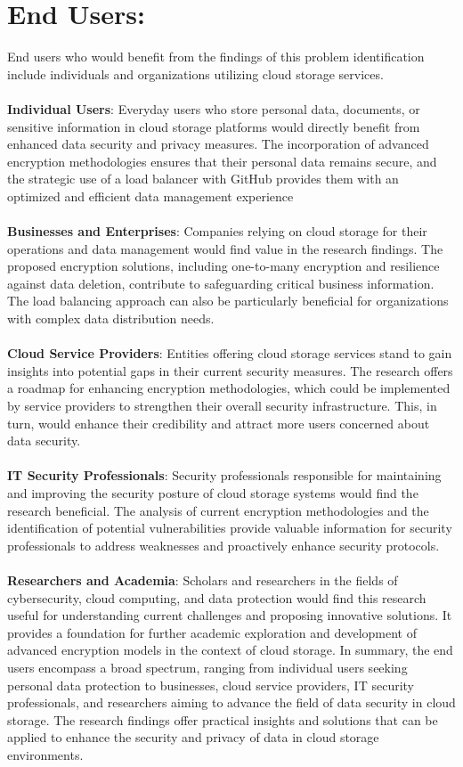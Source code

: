\section {End Users:} End users who would benefit from the findings of this problem identification include individuals
and organizations utilizing cloud storage services.\\
\\
\textbf{Individual Users}: Everyday users who store personal data, documents, or sensitive information in
cloud storage platforms would directly benefit from enhanced data security and privacy measures.
The incorporation of advanced encryption methodologies ensures that their personal data remains
secure, and the strategic use of a load balancer with GitHub provides them with an optimized and
efficient data management experience
\\
\\
\textbf{Businesses and Enterprises}: Companies relying on cloud storage for their operations and data
management would find value in the research findings. The proposed encryption solutions,
including one-to-many encryption and resilience against data deletion, contribute to safeguarding
critical business information. The load balancing approach can also be particularly beneficial for
organizations with complex data distribution needs.
\\
\\
\textbf{Cloud Service Providers}: Entities offering cloud storage services stand to gain insights into
potential gaps in their current security measures. The research offers a roadmap for enhancing
encryption methodologies, which could be implemented by service providers to strengthen their
overall security infrastructure. This, in turn, would enhance their credibility and attract more users
concerned about data security.
\\
\\
\textbf{IT Security Professionals}: Security professionals responsible for maintaining and improving the
security posture of cloud storage systems would find the research beneficial. The analysis of current encryption methodologies and the identification of potential vulnerabilities provide valuable
information for security professionals to address weaknesses and proactively enhance security
protocols. 
\\
\\
\textbf{Researchers and Academia}: Scholars and researchers in the fields of cybersecurity, cloud
computing, and data protection would find this research useful for understanding current challenges
and proposing innovative solutions. It provides a foundation for further academic exploration and
development of advanced encryption models in the context of cloud storage.
In summary, the end users encompass a broad spectrum, ranging from individual users seeking
personal data protection to businesses, cloud service providers, IT security professionals, and
researchers aiming to advance the field of data security in cloud storage. The research findings offer
practical insights and solutions that can be applied to enhance the security and privacy of data in
cloud storage environments. 


\clearpage

